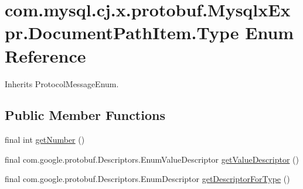 \hypertarget{enumcom_1_1mysql_1_1cj_1_1x_1_1protobuf_1_1_mysqlx_expr_1_1_document_path_item_1_1_type}{}\section{com.\+mysql.\+cj.\+x.\+protobuf.\+Mysqlx\+Expr.\+Document\+Path\+Item.\+Type Enum Reference}
\label{enumcom_1_1mysql_1_1cj_1_1x_1_1protobuf_1_1_mysqlx_expr_1_1_document_path_item_1_1_type}


Inherits Protocol\+Message\+Enum.

\subsection*{Public Member Functions}
\begin{DoxyCompactItemize}
\item 
final int \mbox{\hyperlink{enumcom_1_1mysql_1_1cj_1_1x_1_1protobuf_1_1_mysqlx_expr_1_1_document_path_item_1_1_type_ab312e50172e44c4d043b4a43be8de8b5}{get\+Number}} ()
\item 
final com.\+google.\+protobuf.\+Descriptors.\+Enum\+Value\+Descriptor \mbox{\hyperlink{enumcom_1_1mysql_1_1cj_1_1x_1_1protobuf_1_1_mysqlx_expr_1_1_document_path_item_1_1_type_a9b4ce917e3b35605364d4fdf0fa86663}{get\+Value\+Descriptor}} ()
\item 
final com.\+google.\+protobuf.\+Descriptors.\+Enum\+Descriptor \mbox{\hyperlink{enumcom_1_1mysql_1_1cj_1_1x_1_1protobuf_1_1_mysqlx_expr_1_1_document_path_item_1_1_type_a7955e68677cf4216c4c49a882f9d6fb8}{get\+Descriptor\+For\+Type}} ()
\end{DoxyCompactItemize}
